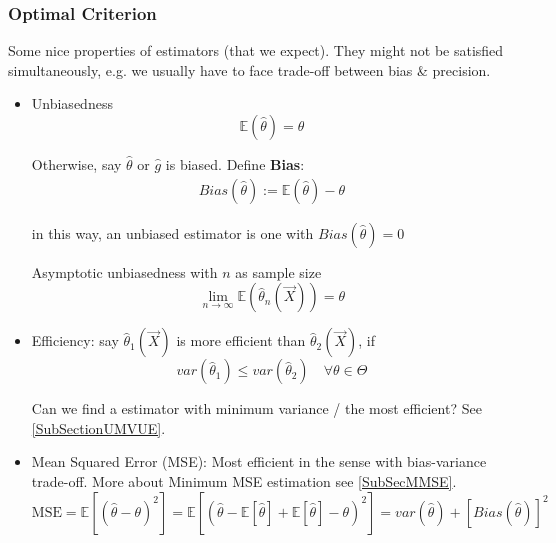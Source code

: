 \subsubsection{Optimal Criterion}\label{SubSectionOptimalCriterion}
        Some nice properties of estimators (that we expect). They might not be satisfied simultaneously, e.g. we usually have to face trade-off between bias \& precision.
    \begin{itemize}
        \item Unbiasedness
        \begin{equation}
            \mathbb{E}(\hat{\theta})=\theta
        \end{equation}

        Otherwise, say $\hat{\theta}$ or $\hat{g}$ is biased. Define \textbf{Bias}:
        \begin{align*}
            Bias(\hat{\theta }):= \mathbb{E}(\hat{\theta})-\theta
        \end{align*}
        
        in this way, an unbiased estimator is one with $ Bias(\hat{\theta })=0 $

        Asymptotic unbiasedness with $ n $ as sample size
        \begin{equation}
            \lim_{n\to\infty}  \mathbb{E}(\hat{\theta }_n(\vec{X})) =\theta 
        \end{equation}
        \item Efficiency: say $\hat{\theta }_1(\vec{X})$ is more efficient than $\hat{\theta }_2(\vec{X})$, if
        \begin{equation}
            var(\hat{\theta }_1)\leq var(\hat{\theta }_2)  \quad\forall\theta\in\Theta  
        \end{equation}

        Can we find a estimator with minimum variance / the most efficient? See \autoref{SubSectionUMVUE}.
        \item Mean Squared Error (MSE): Most efficient in the sense with bias-variance trade-off. More about Minimum MSE estimation see \autoref{SubSecMMSE}.
        \begin{equation}\label{EqaMSEExpansion}
            \text{MSE}=\mathbb{E}[(\hat{\theta}-\theta)^2]=\mathbb{E}\left[ (\hat{\theta }-\mathbb{E}\left[ \hat{\theta}  \right] +\mathbb{E}\left[ \hat{\theta } \right]-\theta  )^2 \right] =var(\hat{\theta})+[Bias(\hat{\theta})]^2
        \end{equation}


\end{itemize}
